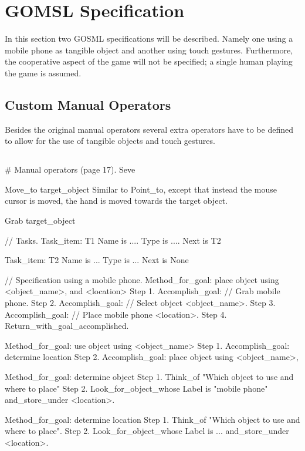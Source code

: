 \documentclass[a4paper,11pt]{report}
\begin{document}
	\section{GOMSL Specification}
	In this section two GOSML specifications will be described. Namely one using a mobile phone as tangible object and another using touch gestures. Furthermore, the cooperative aspect of the game will not be specified; a single human playing the game is assumed.
	
		\subsection{Custom Manual Operators}
		Besides the original manual operators several extra operators have to be defined to allow for the use of tangible objects and touch gestures.
		
		\subsection{}

# Manual operators (page 17).
Seve

Move_to target_object
Similar to Point_to, except that instead the mouse cursor is moved, the hand is moved towards the target object.

Grab target_object


// Tasks.
Task_item: T1
	Name is ....
	Type is ....
	Next is T2
	
Task_item: T2
	Name is ...
	Type is ...
	Next is None

// Specification using a mobile phone.
Method_for_goal: place object using <object_name>, and <location>
	Step 1. Accomplish_goal: // Grab mobile phone.
	Step 2. Accomplish_goal: // Select object <object_name>.
	Step 3. Accomplish_goal: // Place mobile phone <location>.
	Step 4. Return_with_goal_accomplished.
	
Method_for_goal: use object using <object_name>
	Step 1. Accomplish_goal: determine location
	Step 2. Accomplish_goal: place object using <object_name>, 


Method_for_goal: determine object
	Step 1. Think_of "Which object to use and where to place"
	Step 2. Look_for_object_whose Label is "mobile phone"
			and_store_under <location>.


Method_for_goal: determine location
	Step 1. Think_of "Which object to use and where to place".
	Step 2. Look_for_object_whose Label is ...
	 		and_store_under <location>.
	
\end{document}
